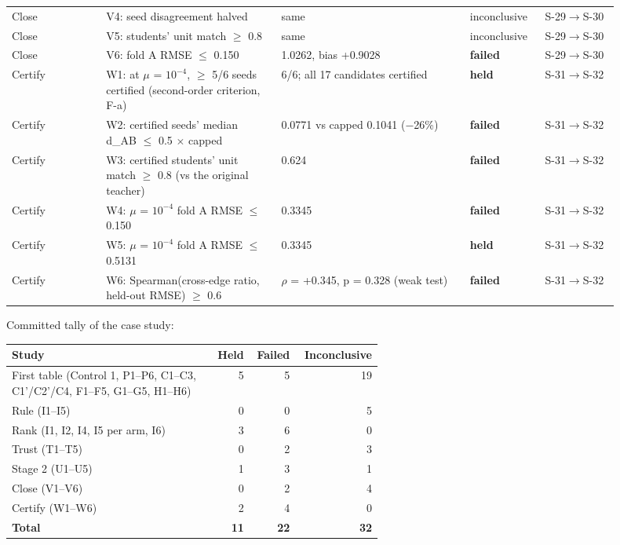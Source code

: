 {\begin{longtable}{R{0.14\linewidth} R{0.26\linewidth} R{0.29\linewidth} R{0.10\linewidth} R{0.11\linewidth}}
Close & V4: seed disagreement halved & same & inconclusive & S-29$\to$\allowbreak{}S-30 \\
Close & V5: students' unit match $\geq$ 0.8 & same & inconclusive & S-29$\to$\allowbreak{}S-30 \\
Close & V6: fold A RMSE $\leq$ 0.150 & 1.0262, bias +0.9028 & \textbf{failed} & S-29$\to$\allowbreak{}S-30 \\
Certify & W1: at $\mu$ = $10^{-4}$, $\geq$ 5/6 seeds certified (second-order criterion, F-a) & 6/6; all 17 candidates certified & \textbf{held} & S-31$\to$\allowbreak{}S-32 \\
Certify & W2: certified seeds' median d\_AB $\leq$ 0.5 $\times$ capped & 0.0771 vs capped 0.1041 ($-$26\%) & \textbf{failed} & S-31$\to$\allowbreak{}S-32 \\
Certify & W3: certified students' unit match $\geq$ 0.8 (vs the original teacher) & 0.624 & \textbf{failed} & S-31$\to$\allowbreak{}S-32 \\
Certify & W4: $\mu$ = $10^{-4}$ fold A RMSE $\leq$ 0.150 & 0.3345 & \textbf{failed} & S-31$\to$\allowbreak{}S-32 \\
Certify & W5: $\mu$ = $10^{-4}$ fold A RMSE $\leq$ 0.5131 & 0.3345 & \textbf{held} & S-31$\to$\allowbreak{}S-32 \\
Certify & W6: Spearman(cross-edge ratio, held-out RMSE) $\geq$ 0.6 & $\rho$ = +0.345, p = 0.328 (weak test) & \textbf{failed} & S-31$\to$\allowbreak{}S-32 \\
\bottomrule
\end{longtable}}
\noindent Committed tally of the case study:

{\footnotesize\setlength{\tabcolsep}{3pt}
\begin{longtable}{R{0.55\linewidth} r r r}
\toprule
Study & Held & Failed & Inconclusive \\
\midrule
\endhead
First table (Control 1, P1--P6, C1--C3, C1'/C2'/C4, F1--F5, G1--G5, H1--H6) & 5 & 5 & 19 \\
Rule (I1--I5) & 0 & 0 & 5 \\
Rank (I1, I2, I4, I5 per arm, I6) & 3 & 6 & 0 \\
Trust (T1--T5) & 0 & 2 & 3 \\
Stage 2 (U1--U5) & 1 & 3 & 1 \\
Close (V1--V6) & 0 & 2 & 4 \\
Certify (W1--W6) & 2 & 4 & 0 \\
\textbf{Total} & \textbf{11} & \textbf{22} & \textbf{32} \\
\bottomrule
\end{longtable}}
